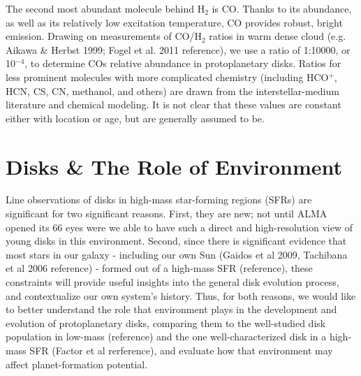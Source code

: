 



The second most abundant molecule behind H$_2$ is CO. Thanks to its abundance, as well as its relatively low excitation temperature, CO provides robust, bright emission. Drawing on measurements of CO/H$_2$ ratios in warm dense cloud (e.g. Aikawa \& Herbst 1999; Fogel et al. 2011 reference), we use a ratio of 1:10000, or 10$^{-4}$, to determine COs relative abundance in protoplanetary disks. Ratios for less prominent molecules with more complicated chemistry (including HCO$^+$, HCN, CS, CN, methanol, and others) are drawn from the interstellar-medium literature and chemical modeling. It is not clear that these values are constant either with location or age, but are generally assumed to be.




\section{Disks \& The Role of Environment}

Line observations of disks in high-mass star-forming regions (SFRs) are significant for two significant reasons. First, they are new; not until ALMA opened its 66 eyes were we able to have such a direct and high-resolution view of young disks in this environment. Second, since there is significant evidence that most stars in our galaxy - including our own Sun (Gaidos et al 2009, Tachibana et al 2006 reference) - formed out of a high-mass SFR (reference), these constraints will provide useful insights into the general disk evolution process, and contextualize our own system's history. Thus, for both reasons, we would like to better understand the role that environment plays in the development and evolution of protoplanetary disks, comparing them to the well-studied disk population in low-mass (reference) and the one well-characterized disk in a high-mass SFR (Factor et al rerference), and evaluate how that environment may affect planet-formation potential.



